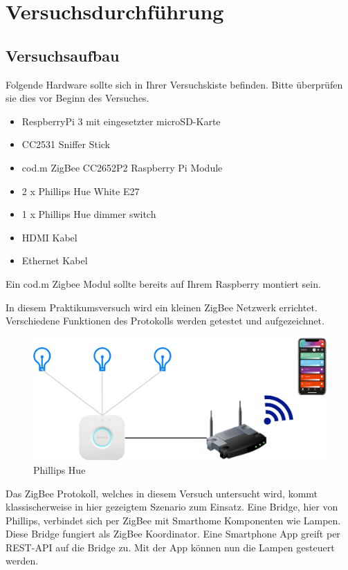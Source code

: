 \chapter{Versuchsdurchführung}

\section{Versuchsaufbau}

Folgende Hardware sollte sich in Ihrer Versuchskiste befinden. Bitte überprüfen sie dies vor Beginn des Versuches.

\begin{itemize}
    \item RespberryPi 3 mit eingesetzter microSD-Karte
    \item CC2531 Sniffer Stick
    \item cod.m ZigBee CC2652P2 Raspberry Pi Module
    \item 2 x Phillips Hue White E27
    \item 1 x Phillips Hue dimmer switch
    \item HDMI Kabel
    \item Ethernet Kabel
\end{itemize}

Ein cod.m Zigbee Modul sollte bereits auf Ihrem Raspberry montiert sein. 

In diesem Praktikumsversuch wird ein kleinen ZigBee Netzwerk errichtet. Verschiedene Funktionen des Protokolls werden getestet und aufgezeichnet.


\begin{figure}[H]
    \centering
    \includegraphics[width=1\textwidth]{media/zbhue.png}
    \caption{Phillips Hue}
\end{figure}
Das ZigBee Protokoll, welches in diesem Versuch untersucht wird, kommt klassischerweise in hier gezeigtem Szenario zum Einsatz.
Eine Bridge, hier von Phillips, verbindet sich per ZigBee mit Smarthome Komponenten wie Lampen. Diese Bridge fungiert als ZigBee Koordinator. 
Eine Smartphone App greift per REST-API auf die Bridge zu. Mit der App können nun die Lampen gesteuert werden.

